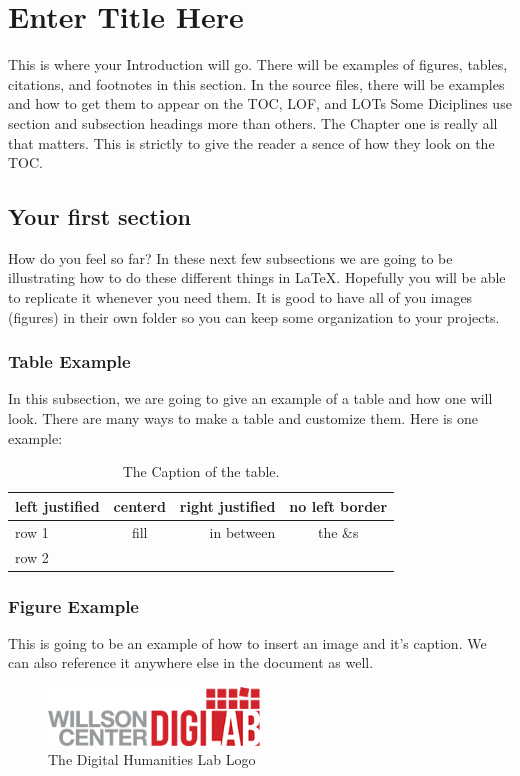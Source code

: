 \documentclass[./dissertation.tex]{subfiles}
\begin{document}
    \chapter{Enter Title Here}
    This is where your Introduction will go. There will be examples of figures, tables, citations, and footnotes in this section. In the source files, there will be examples and how to get them to appear on the TOC, LOF, and LOTs Some Diciplines use section and subsection headings more than others. The Chapter one is really all that matters. This is strictly to give the reader a sence of how they look on the TOC.
    \section{Your first section}
      How do you feel so far? In these next few subsections we are going to be illustrating how to do these different things in LaTeX. Hopefully you will be able to replicate it whenever you need them.
      It is good to have all of you images (figures) in their own folder so you can keep some organization to your projects.

      \subsection{Table Example}
      In this subsection, we are going to give an example of a table and how one will look. There are many ways to make a table and customize them. Here is one example:


      \begin{table}[ht]
        \centering
      \begin{tabular}[c]{|l|c|rc|}
        \hline
        left justified  & centerd  & right justified  & no left border\\
        \hline
        row 1 & fill & in between & the \&s\\
        row 2 & & &\\
        \hline


      \end{tabular}
      \caption{The Caption of the table.}
      \label{table:someLabel}
      \end{table}



      \subsection{Figure Example}
      This is going to be an example of how to insert an image and it's caption. We can also reference it anywhere else in the document as well.
      \begin{figure}[h]
        \centering\includegraphics[width=0.5\textwidth]{figures/digilab_logo}
        \caption{The Digital Humanities Lab Logo}
      \end{figure}
\end{document}
